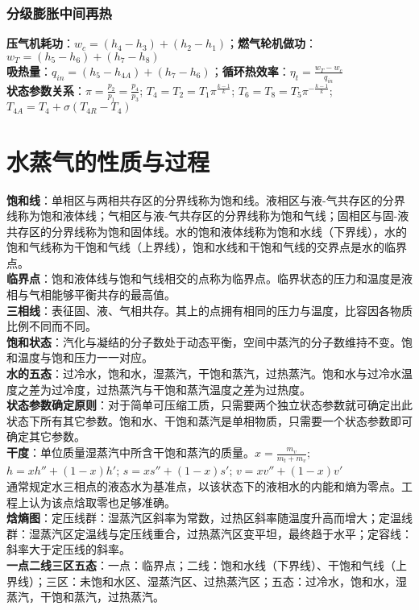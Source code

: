 \documentclass[a4paper,9pt]{ctexart}
\begin{document}
\subsubsection{分级膨胀中间再热}
\noindent
\textbf{压气机耗功}：$w_c=(h_4-h_3)+(h_2-h_1)$；\textbf{燃气轮机做功}：$w_T=(h_5-h_6)+(h_7-h_8)$\\
\textbf{吸热量}：$q_{in}=(h_5-h_{4A})+(h_7-h_6)$；\textbf{循环热效率}：$\eta_t=\frac{w_T-w_c}{q_{in}}$\\
\textbf{状态参数关系}：$\pi=\frac{p_2}{p_1}=\frac{p_4}{p_3}$; $T_4=T_2=T_1\pi^{\frac{k-1}{k}}$; $T_6=T_8=T_5\pi^{-\frac{k-1}{k}}$; $T_{4A}=T_4+\sigma(T_{4R}-T_4)$

\section{水蒸气的性质与过程}
\noindent
\textbf{饱和线}：单相区与两相共存区的分界线称为饱和线。液相区与液-气共存区的分界线称为饱和液体线；气相区与液-气共存区的分界线称为饱和气线；固相区与固-液共存区的分界线称为饱和固体线。水的饱和液体线称为饱和水线（下界线），水的饱和气线称为干饱和气线（上界线），饱和水线和干饱和气线的交界点是水的临界点。
\\
\textbf{临界点}：饱和液体线与饱和气线相交的点称为临界点。临界状态的压力和温度是液相与气相能够平衡共存的最高值。\\
\textbf{三相线}：表征固、液、气相共存。其上的点拥有相同的压力与温度，比容因各物质比例不同而不同。\\
\textbf{饱和状态}：汽化与凝结的分子数处于动态平衡，空间中蒸汽的分子数维持不变。饱和温度与饱和压力一一对应。\\
\textbf{水的五态}：过冷水，饱和水，湿蒸汽，干饱和蒸汽，过热蒸汽。饱和水与过冷水温度之差为过冷度，过热蒸汽与干饱和蒸汽温度之差为过热度。\\
\textbf{状态参数确定原则}：对于简单可压缩工质，只需要两个独立状态参数就可确定出此状态下所有其它参数。饱和水、干饱和蒸汽是单相物质，只需要一个状态参数即可确定其它参数。\\
\textbf{干度}：单位质量湿蒸汽中所含干饱和蒸汽的质量。$x=\frac{m_v}{m_t+m_v}$; $h=xh''+(1-x)h'$; 
$s=xs''+(1-x)s'$; $v=xv''+(1-x)v'$\\
通常规定水三相点的液态水为基准点，以该状态下的液相水的内能和熵为零点。工程上认为该点焓取零也足够准确。\\
\textbf{焓熵图}：定压线群：湿蒸汽区斜率为常数，过热区斜率随温度升高而增大；定温线群：湿蒸汽区定温线与定压线重合，过热蒸汽区变平坦，最终趋于水平；定容线：斜率大于定压线的斜率。\\
\textbf{一点二线三区五态}：一点：临界点；二线：饱和水线（下界线）、干饱和气线（上界线）；三区：未饱和水区、湿蒸汽区、过热蒸汽区；五态：过冷水，饱和水，湿蒸汽，干饱和蒸汽，过热蒸汽。
\end{document}

